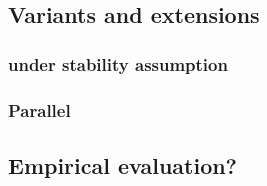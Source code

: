 
\subsection{Variants and extensions}
\label{sub:variants_and_extensions}

\subsubsection{\pcc{} under stability assumption}
\label{ssub:cc_under_stability_assumption}

\iffalse
Haris Angelidakis, Konstantin Makarychev, and Yury Makarychev. 2017.
Algorithms for Stable and Perturbation-Resilient Problems. STOC’17
\href{http://ttic.uchicago.edu/~yury/papers/two-stable.pdf}{10.1145/3055399.3055487}
improves over the one cited in the internship description
\fi

\subsubsection{Parallel \pcc{}}
\label{ssub:parallel_cc}

\subsection{Empirical evaluation?}
\label{sub:cc_empiracal_evaluation}
